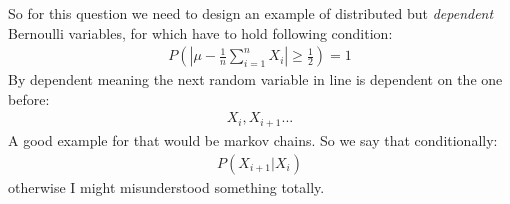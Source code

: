 So for this question we need to design an example of distributed but \textit{dependent} Bernoulli variables, for which have to hold following condition:
\begin{align}
	P\left(|\mu - \frac{1}{n} \sum_{i=1}^n X_i|\geq \frac{1}{2}\right) = 1
\end{align}
By dependent meaning the next random variable in line is dependent on the one before:
\begin{align}
	X_i,X_{i+1} ...
\end{align}
A good example for that would be markov chains.
So we say that conditionally:
\begin{align}
	P(X_{i+1}|X_i)
\end{align}
otherwise I might misunderstood something totally.





